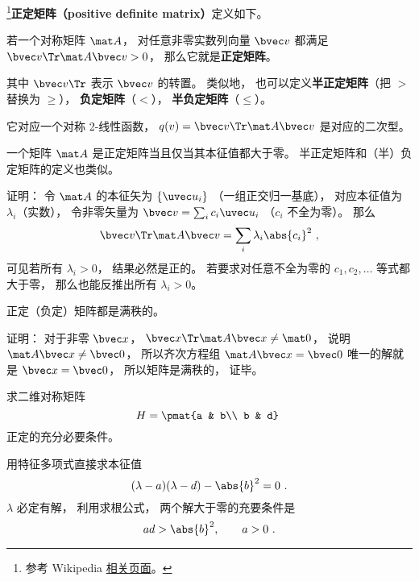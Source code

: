 

\footnote{参考 Wikipedia \href{https://en.wikipedia.org/wiki/Definite_matrix}{相关页面}。}\textbf{正定矩阵（positive definite matrix）}定义如下。
\begin{definition}{}
若一个对称矩阵 $\mat A$， 对任意非零实数列向量 $\bvec v$ 都满足 $\bvec v\Tr \mat A \bvec v > 0$， 那么它就是\textbf{正定矩阵}。
\end{definition}
其中 $\bvec v\Tr$ 表示 $\bvec v$ 的转置。 类似地， 也可以定义\textbf{半正定矩阵}（把 $>$ 替换为 $\geqslant$）， \textbf{负定矩阵}（$<$）， \textbf{半负定矩阵}（$\leqslant$）。

它对应一个对称 2-线性函数， $q(v) = \bvec v\Tr \mat A \bvec v$ 是对应的二次型。

\begin{theorem}{}
一个矩阵 $\mat A$ 是正定矩阵当且仅当其本征值都大于零。 半正定矩阵和（半）负定矩阵的定义也类似。
\end{theorem}

证明： 令 $\mat A$ 的本征矢为 $\{\uvec u_i\}$ （一组正交归一基底）， 对应本征值为 $\lambda_i$（实数）， 令非零矢量为 $\bvec v = \sum_i c_i \uvec u_i$ （$c_i$ 不全为零）。 那么
\begin{equation}
\bvec v\Tr \mat A \bvec v = \sum_i \lambda_i \abs{c_i}^2~,
\end{equation}
可见若所有 $\lambda_i > 0$， 结果必然是正的。 若要求对任意不全为零的 $c_1,c_2,\dots$ 等式都大于零， 那么也能反推出所有 $\lambda_i > 0$。

\begin{theorem}{}
正定（负定）矩阵都是满秩的。
\end{theorem}
证明： 对于非零 $\bvec x$， $\bvec x\Tr \mat A \bvec x \ne \mat 0$， 说明 $\mat A\bvec x \ne \bvec 0$， 所以齐次方程组 $\mat A\bvec x = \bvec 0$ 唯一的解就是 $\bvec x = \bvec 0$， 所以矩阵是满秩的， 证毕。

\begin{example}{}
求二维对称矩阵
\begin{equation}
H = \pmat{a & b\\ b & d}~
\end{equation}
正定的充分必要条件。

用特征多项式直接求本征值
\begin{equation}
(\lambda - a)(\lambda - d) - \abs{b}^2 = 0~.
\end{equation}
$\lambda$ 必定有解， 利用求根公式， 两个解大于零的充要条件是
\begin{equation}
ad > \abs{b}^2, \qquad
a > 0~.
\end{equation}
\end{example}

